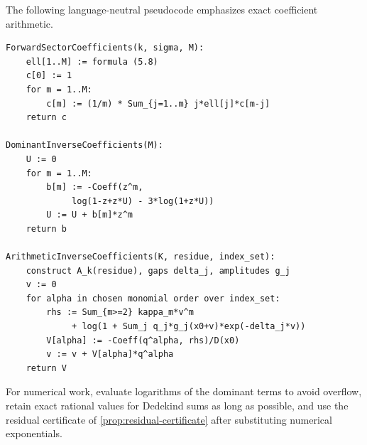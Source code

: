 \documentclass[11pt,a4paper]{article}
\numberwithin{equation}{section}
\theoremstyle{remark}
\begin{document}
The following language-neutral pseudocode emphasizes exact coefficient arithmetic.

\begin{lstlisting}[basicstyle=\ttfamily\small,frame=single,breaklines=true]
ForwardSectorCoefficients(k, sigma, M):
    ell[1..M] := formula (5.8)
    c[0] := 1
    for m = 1..M:
        c[m] := (1/m) * Sum_{j=1..m} j*ell[j]*c[m-j]
    return c

DominantInverseCoefficients(M):
    U := 0
    for m = 1..M:
        b[m] := -Coeff(z^m,
             log(1-z+z*U) - 3*log(1+z*U))
        U := U + b[m]*z^m
    return b

ArithmeticInverseCoefficients(K, residue, index_set):
    construct A_k(residue), gaps delta_j, amplitudes g_j
    v := 0
    for alpha in chosen monomial order over index_set:
        rhs := Sum_{m>=2} kappa_m*v^m
             + log(1 + Sum_j q_j*g_j(x0+v)*exp(-delta_j*v))
        V[alpha] := -Coeff(q^alpha, rhs)/D(x0)
        v := v + V[alpha]*q^alpha
    return V
\end{lstlisting}

For numerical work, evaluate logarithms of the dominant terms to avoid overflow, retain exact rational values for Dedekind sums as long as possible, and use the residual certificate of \cref{prop:residual-certificate} after substituting numerical exponentials.
\end{document}
